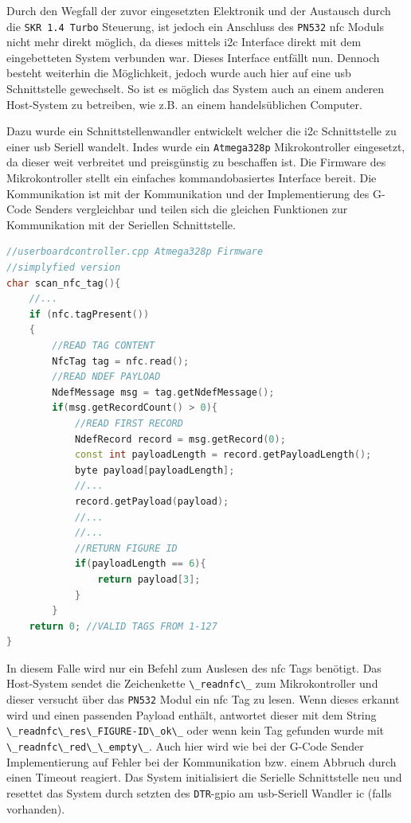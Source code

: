 Durch den Wegfall der zuvor eingesetzten Elektronik und der Austausch
durch die \passthrough{\lstinline!SKR 1.4 Turbo!} Steuerung, ist jedoch
ein Anschluss des \passthrough{\lstinline!PN532!} \gls{nfc} Moduls nicht
mehr direkt möglich, da dieses mittels \gls{i2c} Interface direkt mit
dem eingebetteten System verbunden war. Dieses Interface entfällt nun.
Dennoch besteht weiterhin die Möglichkeit, jedoch wurde auch hier auf
eine \gls{usb} Schnittstelle gewechselt. So ist es möglich das System
auch an einem anderen Host-System zu betreiben, wie z.B. an einem
handelsüblichen Computer.

Dazu wurde ein Schnittstellenwandler entwickelt welcher die \gls{i2c}
Schnittstelle zu einer \gls{usb} Seriell wandelt. Indes wurde ein
\passthrough{\lstinline!Atmega328p!} Mikrokontroller eingesetzt, da
dieser weit verbreitet und preisgünstig zu beschaffen ist. Die Firmware
des Mikrokontroller stellt ein einfaches kommandobasiertes Interface
bereit. Die Kommunikation ist mit der Kommunikation und der
Implementierung des G-Code Senders vergleichbar und teilen sich die
gleichen Funktionen zur Kommunikation mit der Seriellen Schnittstelle.

\begin{lstlisting}[language={C++}]
//userboardcontroller.cpp Atmega328p Firmware
//simplyfied version
char scan_nfc_tag(){
    //...
    if (nfc.tagPresent())
    {
        //READ TAG CONTENT
        NfcTag tag = nfc.read();
        //READ NDEF PAYLOAD
        NdefMessage msg = tag.getNdefMessage();
        if(msg.getRecordCount() > 0){
            //READ FIRST RECORD
            NdefRecord record = msg.getRecord(0);
            const int payloadLength = record.getPayloadLength();
            byte payload[payloadLength];
            //...
            record.getPayload(payload);
            //...
            //...
            //RETURN FIGURE ID
            if(payloadLength == 6){
                return payload[3];
            }
        }
    return 0; //VALID TAGS FROM 1-127
}
\end{lstlisting}

In diesem Falle wird nur ein Befehl zum Auslesen des \gls{nfc} Tags
benötigt. Das Host-System sendet die Zeichenkette
\passthrough{\lstinline!\_readnfc\_!} zum Mikrokontroller und dieser
versucht über das \passthrough{\lstinline!PN532!} Modul ein \gls{nfc}
Tag zu lesen. Wenn dieses erkannt wird und einen passenden Payload
enthält, antwortet dieser mit dem String
\passthrough{\lstinline!\_readnfc\_res\_FIGURE-ID\_ok\_!} oder wenn kein
Tag gefunden wurde mit
\passthrough{\lstinline!\_readnfc\_red\_\_empty\_!}. Auch hier wird wie
bei der G-Code Sender Implementierung auf Fehler bei der Kommunikation
bzw. einem Abbruch durch einen Timeout reagiert. Das System
initialisiert die Serielle Schnittstelle neu und resettet das System
durch setzten des \passthrough{\lstinline!DTR!}-\gls{gpio} am
\gls{usb}-Seriell Wandler \gls{ic} (falls vorhanden).


